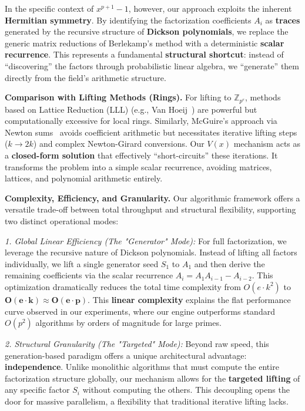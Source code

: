 \documentclass[12pt]{article}
\theoremstyle{plain}
\numberwithin{equation}{section}
\begin{document}
In the specific context of $x^{p+1}-1$, however, our approach exploits the inherent \textbf{Hermitian symmetry}. By identifying the factorization coefficients $A_i$ as \textbf{traces} generated by the recursive structure of \textbf{Dickson polynomials}, we replace the generic matrix reductions of Berlekamp's method with a deterministic \textbf{scalar recurrence}.
This represents a fundamental \textbf{structural shortcut}: instead of ``discovering'' the factors through probabilistic linear algebra, we ``generate'' them directly from the field's arithmetic structure.

\textbf{Comparison with Lifting Methods (Rings).}
For lifting to $\mathbb{Z}_{p^e}$, methods based on Lattice Reduction (LLL) (e.g., Van Hoeij~\cite{Hoeij2002}) are powerful but computationally excessive for local rings. Similarly, McGuire's approach via Newton sums~\cite{McGuire2001} avoids coefficient arithmetic but necessitates iterative lifting steps ($k \to 2k$) and complex Newton-Girard conversions.
Our $V(x)$ mechanism acts as a \textbf{closed-form solution} that effectively ``short-circuits'' these iterations. It transforms the problem into a simple scalar recurrence, avoiding matrices, lattices, and polynomial arithmetic entirely.

\textbf{Complexity, Efficiency, and Granularity.}
Our algorithmic framework offers a versatile trade-off between total throughput and structural flexibility, supporting two distinct operational modes:

\textit{1. Global Linear Efficiency (The "Generator" Mode):} 
For full factorization, we leverage the recursive nature of Dickson polynomials. Instead of lifting all factors individually, we lift a single generator seed $S_1$ to $A_1$ and then derive the remaining coefficients via the scalar recurrence $A_i = A_1 A_{i-1} - A_{i-2}$. This optimization dramatically reduces the total time complexity from $O(e \cdot k^2)$ to $\mathbf{O(e \cdot k)} \approx \mathbf{O(e \cdot p)}$. This \textbf{linear complexity} explains the flat performance curve observed in our experiments, where our engine outperforms standard $O(p^2)$ algorithms by orders of magnitude for large primes.

\textit{2. Structural Granularity (The "Targeted" Mode):} 
Beyond raw speed, this generation-based paradigm offers a unique architectural advantage: \textbf{independence}. Unlike monolithic algorithms that must compute the entire factorization structure globally, our mechanism allows for the \textbf{targeted lifting} of any specific factor $S_i$ without computing the others. This decoupling opens the door for massive parallelism, a flexibility that traditional iterative lifting lacks.
\end{document}
